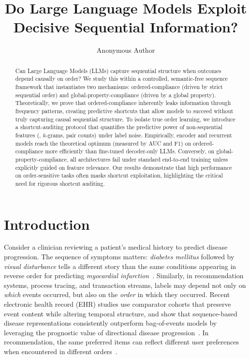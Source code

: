 \documentclass[fullpaper]{nldl}
\title{Do Large Language Models Exploit Decisive Sequential Information?}
\author[1]{Anonymous Author}
\affil[1]{Anonymous Affiliation}
\theoremstyle{plain}
\theoremstyle{definition}
\theoremstyle{remark}
\begin{document}
\maketitle

\begin{abstract}
Can Large Language Models (LLMs) capture sequential structure when outcomes depend causally on order? We study this within a controlled, semantic-free sequence framework that instantiates two mechanisms: ordered-compliance (driven by strict sequential order) and global-property-compliance (driven by a global property). Theoretically, we prove that ordered-compliance inherently leaks information through frequency patterns, creating predictive shortcuts that allow models to succeed without truly capturing causal sequential structure. To isolate true order learning, we introduce a shortcut-auditing protocol that quantifies the predictive power of non-sequential features (\eg, $k$-grams, pair counts) under label noise. Empirically, encoder and recurrent models reach the theoretical optimum (measured by AUC and F1) on ordered-compliance more efficiently than fine-tuned decoder-only LLMs. Conversely, on global-property-compliance, all architectures fail under standard end-to-end training unless explicitly guided on feature relevance. Our results demonstrate that high performance on order-sensitive tasks often masks shortcut exploitation, highlighting the critical need for rigorous shortcut auditing.
\end{abstract}

\section{Introduction}
\label{sec:introduction}

Consider a clinician reviewing a patient's medical history to predict disease progression. The sequence of symptoms matters: \textit{diabetes mellitus} followed by \textit{visual disturbance} tells a different story than the same conditions appearing in reverse order for predicting \textit{myocardial infarction}~\citep{edelman2026order_specific_ehr}. Similarly, in recommendation systems, process tracing, and transaction streams, labels may depend not only on \emph{which} events occurred, but also on the \emph{order} in which they occurred. Recent electronic health record (EHR) studies use comparator cohorts that preserve event content while altering temporal structure, and show that sequence-based disease representations consistently outperform bag-of-events models by leveraging the prognostic value of directional disease progression~\citep{edelman2026order_specific_ehr,beaney2024coded_disease_representations,placido2023pancreatic_trajectories,pollington2026trajectory_review}. In recommendation, the same preferred items can reflect different user preferences when encountered in different orders~\citep{kimLostSequenceLarge2025b}.
\end{document}
